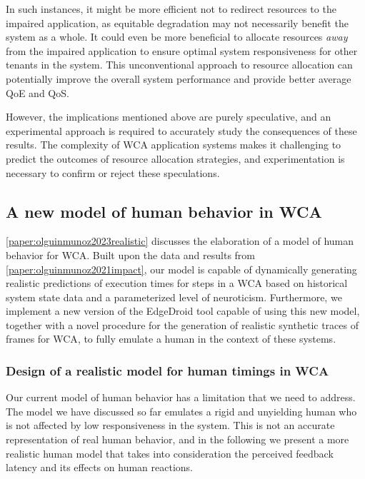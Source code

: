 In such instances, it might be more efficient not to redirect resources to the impaired application, as equitable degradation may not necessarily benefit the system as a whole.
It could even be more beneficial to allocate resources \emph{away} from the impaired application to ensure optimal system responsiveness for other tenants in the system.
This unconventional approach to resource allocation can potentially improve the overall system performance and provide better average \gls{QoE} and \gls{QoS}.

However, the implications mentioned above are purely speculative, and an experimental approach is required to accurately study the consequences of these results.
The complexity of \gls{WCA} application systems makes it challenging to predict the outcomes of resource allocation strategies, and experimentation is necessary to confirm or reject these speculations.

\subsection{A new model of human behavior in \acs{WCA}}

\cref{paper:olguinmunoz2023realistic} discusses the elaboration of a model of human behavior for \gls{WCA}.
Built upon the data and results from \cref{paper:olguinmunoz2021impact}, our model is capable of dynamically generating realistic predictions of execution times for steps in a \gls{WCA} based on historical system state data and a parameterized level of neuroticism.
Furthermore, we implement a new version of the EdgeDroid tool capable of using this new model, together with a novel procedure for the generation of realistic synthetic traces of frames for \gls{WCA}, to fully emulate a human in the context of these systems.

\subsubsection{Design of a realistic model for human timings in \gls{WCA}}

Our current model of human behavior has a limitation that we need to address.
The model we have discussed so far emulates a rigid and unyielding human who is not affected by low responsiveness in the system.
This is not an accurate representation of real human behavior, and in the following we present a more realistic human model that takes into consideration the perceived feedback latency and its effects on human reactions.

